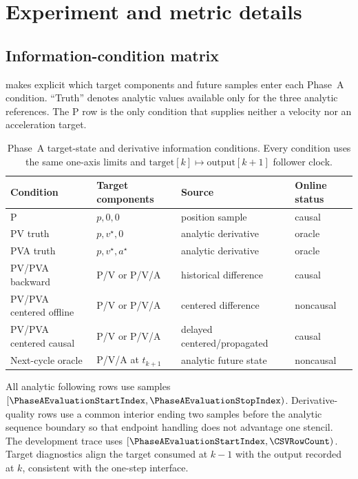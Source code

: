 \section{Experiment and metric details}
\label{app:experiment-details}

\subsection{Information-condition matrix}

 makes explicit which target components and future
samples enter each Phase~A condition.  ``Truth'' denotes analytic values
available only for the three analytic references.  The P row is the only
condition that supplies neither a velocity nor an acceleration target.

\begin{table}[ht]
  \centering
  \caption{Phase~A target-state and derivative information conditions.  Every
  condition uses the same one-axis limits and
  \(\mathrm{target}[k]\mapsto\mathrm{output}[k+1]\) follower clock.}
  \label{tab:phase-a-methods}
  \small
  \begin{tabular}{llll}
    \toprule
    Condition & Target components & Source & Online status \\
    \midrule
    P & \(p,0,0\) & position sample & causal \\
    PV truth & \(p,v^\star,0\) & analytic derivative & oracle \\
    PVA truth & \(p,v^\star,a^\star\) & analytic derivative & oracle \\
    PV/PVA backward & P/V or P/V/A & historical difference & causal \\
    PV/PVA centered offline & P/V or P/V/A & centered difference & noncausal \\
    PV/PVA centered causal & P/V or P/V/A & delayed centered/propagated & causal \\
    Next-cycle oracle & P/V/A at \(t_{k+1}\) & analytic future state & noncausal \\
    \bottomrule
  \end{tabular}
\end{table}

All analytic following rows use samples
\([\PhaseAEvaluationStartIndex,\PhaseAEvaluationStopIndex)\).  Derivative-quality rows
use a common interior ending two samples before the analytic sequence
boundary so that endpoint handling does not advantage one stencil.  The
development trace uses
\([\PhaseAEvaluationStartIndex,\CSVRowCount)\).  Target diagnostics align the target
consumed at \(k-1\) with the output recorded at \(k\), consistent with the
one-step interface.

